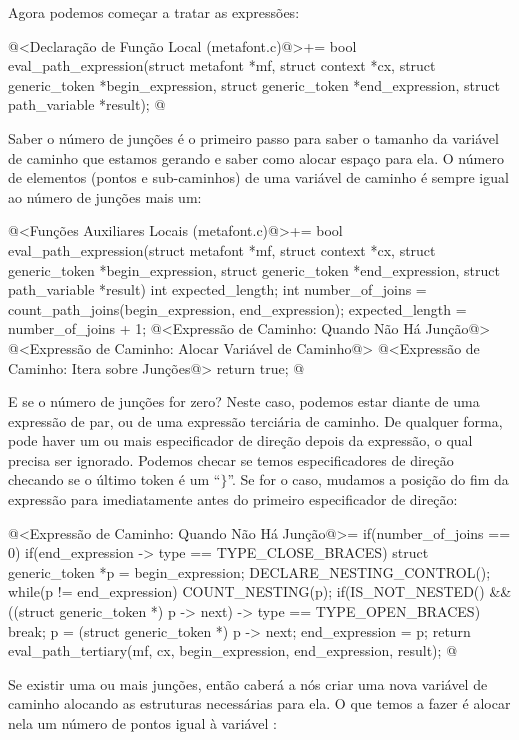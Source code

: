 Agora podemos começar a tratar as expressões:

\iniciocodigo
@<Declaração de Função Local (metafont.c)@>+=
bool eval_path_expression(struct metafont *mf, struct context *cx,
                          struct generic_token *begin_expression,
                          struct generic_token *end_expression,
                          struct path_variable *result);
@
\fimcodigo


Saber o número de junções é o primeiro passo para saber o tamanho da
variável de caminho que estamos gerando e saber como alocar espaço
para ela. O número de elementos (pontos e sub-caminhos) de uma
variável de caminho é sempre igual ao número de junções mais um:

\iniciocodigo
@<Funções Auxiliares Locais (metafont.c)@>+=
bool eval_path_expression(struct metafont *mf, struct context *cx,
                          struct generic_token *begin_expression,
                          struct generic_token *end_expression,
                          struct path_variable *result){
  int expected_length;
  int number_of_joins = count_path_joins(begin_expression, end_expression);
  expected_length = number_of_joins + 1;
  @<Expressão de Caminho: Quando Não Há Junção@>
  @<Expressão de Caminho: Alocar Variável de Caminho@>
  @<Expressão de Caminho: Itera sobre Junções@>
  return true;
}
@
\fimcodigo

E se o número de junções for zero? Neste caso, podemos estar diante de
uma expressão de par, ou de uma expressão terciária de caminho. De
qualquer forma, pode haver um ou mais especificador de direção depois
da expressão, o qual precisa ser ignorado. Podemos checar se temos
especificadores de direção checando se o último token é um
``$\}$''. Se for o caso, mudamos a posição do fim da expressão para
imediatamente antes do primeiro especificador de direção:

\iniciocodigo
@<Expressão de Caminho: Quando Não Há Junção@>=
if(number_of_joins == 0){
  if(end_expression -> type == TYPE_CLOSE_BRACES){
    struct generic_token *p = begin_expression;
    DECLARE_NESTING_CONTROL();
    while(p != end_expression){
      COUNT_NESTING(p);
      if(IS_NOT_NESTED() &&
         ((struct generic_token *) p -> next) -> type == TYPE_OPEN_BRACES)
        break;
      p = (struct generic_token *) p -> next;
    }
    end_expression = p;
  }
  return eval_path_tertiary(mf, cx, begin_expression, end_expression,
                            result);
}
@
\fimcodigo

Se existir uma ou mais junções, então caberá a nós criar uma nova
variável de caminho alocando as estruturas necessárias para ela. O que
temos a fazer é alocar nela um número de pontos igual à
variável :

